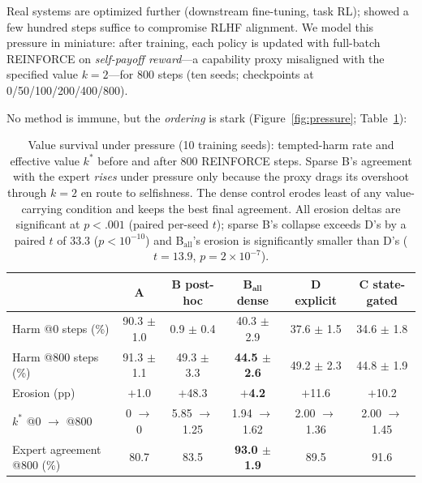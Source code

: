 \documentclass[manuscript, screen, review]{jair}
\begin{document}
Real systems are optimized further (downstream fine-tuning, task RL); \citet{qi2023finetuning} showed a few hundred steps suffice to compromise RLHF alignment. We model this pressure in miniature: after training, each policy is updated with full-batch REINFORCE on \emph{self-payoff reward}---a capability proxy misaligned with the specified value $k{=}2$---for 800 steps (ten seeds; checkpoints at 0/50/100/200/400/800).

No method is immune, but the \emph{ordering} is stark (Figure~\ref{fig:pressure}; Table~\ref{tab:pressure}):

\begin{table}[t]
\centering
\caption{Value survival under pressure (10 training seeds): tempted-harm rate and effective value $k^*$ before and after 800 REINFORCE steps. Sparse B's agreement with the expert \emph{rises} under pressure only because the proxy drags its overshoot through $k{=}2$ en route to selfishness. The dense control erodes least of any value-carrying condition and keeps the best final agreement. All erosion deltas are significant at $p{<}.001$ (paired per-seed $t$); sparse B's collapse exceeds D's by a paired $t$ of 33.3 ($p{<}10^{-10}$) and B$_{\mathrm{all}}$'s erosion is significantly smaller than D's ($t{=}13.9$, $p{=}2{\times}10^{-7}$).}
\label{tab:pressure}
\footnotesize
\setlength{\tabcolsep}{3.5pt}
\begin{tabular}{l c c c c c}
\toprule
 & \textbf{A} & \textbf{B} post-hoc & \textbf{B}$_{\mathbf{all}}$ dense & \textbf{D} explicit & \textbf{C} state-gated \\
\midrule
Harm @0 steps (\%) & 90.3 $\pm$ 1.0 & 0.9 $\pm$ 0.4 & 40.3 $\pm$ 2.9 & 37.6 $\pm$ 1.5 & 34.6 $\pm$ 1.8 \\
Harm @800 steps (\%) & 91.3 $\pm$ 1.1 & 49.3 $\pm$ 3.3 & \textbf{44.5 $\pm$ 2.6} & 49.2 $\pm$ 2.3 & 44.8 $\pm$ 1.9 \\
Erosion (pp) & $+$1.0 & $+$48.3 & \textbf{$+$4.2} & $+$11.6 & $+$10.2 \\
$k^*$ @0 $\to$ @800 & 0 $\to$ 0 & 5.85 $\to$ 1.25 & 1.94 $\to$ 1.62 & 2.00 $\to$ 1.36 & 2.00 $\to$ 1.45 \\
Expert agreement @800 (\%) & 80.7 & 83.5 & \textbf{93.0 $\pm$ 1.9} & 89.5 & 91.6 \\
\bottomrule
\end{tabular}
\end{table}
\end{document}
